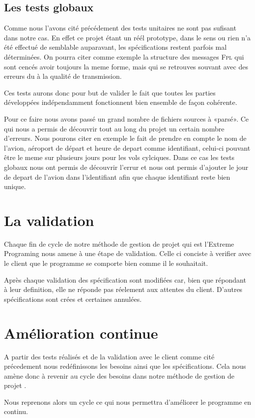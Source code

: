     \subsection{Les tests globaux}
Comme nous l'avons cité précédement des tests unitaires ne sont pas sufisant dans notre cas. En effet ce projet étant un réél prototype, dans le sens ou rien n'a été effectué de semblable auparavant, les spécifications restent parfois mal déterminées. On pourra citer comme exemple la structure des messages \textsc{Fpl} qui sont cencés avoir toujours la meme forme, mais qui se retrouves souvant avec des erreurs du à la qualité de transmission.

Ces tests aurons donc pour but de valider le fait que toutes les parties développées indépendamment fonctionnent bien ensemble de façon cohérente.

Pour ce faire nous avons passé un grand nombre de fichiers sources à «parsé». Ce qui nous a permis de découvrir tout au long du projet un certain nombre d'erreurs. Nous pourons citer en exemple le fait de prendre en compte le nom de l'avion, aéroport de départ et heure de depart comme identifiant, celui-ci pouvant être le meme sur plusieurs jours pour les vols cylciques. Dans ce cas les tests globaux nous ont permis de découvrir l'errur et nous ont permis d'ajouter le jour de depart de l'avion dans l'identifiant afin que chaque identifiant reste bien unique.

\section{La validation}
Chaque fin de cycle de notre méthode de gestion de projet qui est l'Extreme Programing nous amene à une étape de validation. Celle ci conciste à verifier avec le client que le programme se comporte bien comme il le souhaitait.

Après chaque validation des spécification sont modifiées car, bien que répondant à leur definition, elle ne réponde pas réelement aux attentes du client. D'autres spécifications sont crées et certaines annulées.

\section{Amélioration continue}
A partir des tests réalisés et de la validation avec le client comme cité précedement nous redéfinissons les besoins ainsi que les spécifications. Cela nous amène donc à revenir au cycle des besoins  dans notre méthode de gestion de projet .

Nous reprenons alors un cycle ce qui nous permettra d'améliorer le programme en continu.
